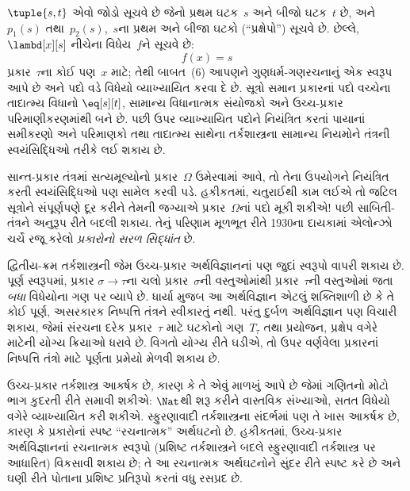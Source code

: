$\tuple{s, t}$ એવો જોડો સૂચવે છે જેનો પ્રથમ ઘટક~$s$ અને બીજો ઘટક~$t$
છે, અને $p_1(s)$ તથા~$p_2(s)$,~$s$ના પ્રથમ અને બીજા ઘટકો
(``પ્રક્ષેપો'') સૂચવે છે. છેલ્લે, $\lambd[x][s]$ નીચેના વિધેય~$f$ને
સૂચવે છે:
\[
f(x) = s
\]
પ્રકાર~$\tau$ના કોઈ પણ~$x$ માટે; તેથી બાબત~(6) આપણને
ગુણધર્મ-ગણરચનાનું એક સ્વરૂપ આપે છે અને પદો વડે વિધેયો વ્યાખ્યાયિત કરવા
દે છે.
સૂત્રો સમાન પ્રકારનાં પદો વચ્ચેના તાદાત્મ્ય વિધાનો
$\eq[s][t]$, સામાન્ય વિધાનાત્મક સંયોજકો અને ઉચ્ચ-પ્રકાર પરિમાણીકરણમાંથી
બને છે. પછી ઉપર વ્યાખ્યાયિત પદોને નિયંત્રિત કરતાં પાયાનાં સમીકરણો અને
પરિમાણકો તથા તાદાત્મ્ય સાથેના તર્કશાસ્ત્રના સામાન્ય નિયમોને તંત્રની
સ્વયંસિદ્ધિઓ તરીકે લઈ શકાય છે.

સાન્ત-પ્રકાર તંત્રમાં સત્યમૂલ્યોનો પ્રકાર~$\Omega$ ઉમેરવામાં આવે, તો
તેના ઉપયોગને નિયંત્રિત કરતી સ્વયંસિદ્ધિઓ પણ સામેલ કરવી પડે. હકીકતમાં,
ચતુરાઈથી કામ લઈએ તો જટિલ સૂત્રોને સંપૂર્ણપણે દૂર કરીને તેમની
જગ્યાએ પ્રકાર~$\Omega$નાં પદો મૂકી શકીએ!{} પછી સાબિતી-તંત્રને અનુરૂપ
રીતે બદલી શકાય. તેનું પરિણામ મૂળભૂત રીતે 1930ના દાયકામાં એલોન્ઝો
ચર્ચે રજૂ કરેલો \emph{પ્રકારોનો સરળ સિદ્ધાંત} છે.

દ્વિતીય-ક્રમ તર્કશાસ્ત્રની જેમ ઉચ્ચ-પ્રકાર અર્થવિજ્ઞાનનાં પણ જુદાં
સ્વરૂપો વાપરી શકાય છે. પૂર્ણ સ્વરૂપમાં, પ્રકાર $\sigma \to \tau$ના ચલો
પ્રકાર~$\sigma$ની વસ્તુઓમાંથી પ્રકાર~$\tau$ની વસ્તુઓમાં જતા \emph{બધા}
વિધેયોના ગણ પર વ્યાપે છે. ધાર્યા મુજબ આ અર્થવિજ્ઞાન એટલું શક્તિશાળી છે
કે તે કોઈ પૂર્ણ, અસરકારક નિષ્પત્તિ તંત્રને સ્વીકારતું નથી. પરંતુ
દુર્બળ અર્થવિજ્ઞાન પણ વિચારી શકાય, જેમાં સંરચના દરેક
પ્રકાર~$\tau$ માટે ઘટકોનો ગણ~$T_\tau$ તથા પ્રયોજન, પ્રક્ષેપ
વગેરે માટેની યોગ્ય ક્રિયાઓ ધરાવે છે. વિગતો યોગ્ય રીતે ઘડીએ, તો ઉપર
વર્ણવેલા પ્રકારનાં નિષ્પત્તિ તંત્રો માટે પૂર્ણતા પ્રમેયો મેળવી
શકાય છે.

ઉચ્ચ-પ્રકાર તર્કશાસ્ત્ર આકર્ષક છે, કારણ કે તે એવું માળખું આપે છે જેમાં
ગણિતનો મોટો ભાગ કુદરતી રીતે સમાવી શકીએ: $\Nat$થી શરૂ કરીને વાસ્તવિક
સંખ્યાઓ, સતત વિધેયો વગેરે વ્યાખ્યાયિત કરી શકીએ. સ્ફુરણાવાદી
તર્કશાસ્ત્રના સંદર્ભમાં પણ તે ખાસ આકર્ષક છે, કારણ કે પ્રકારોનાં સ્પષ્ટ
``રચનાત્મક'' અર્થઘટનો છે. હકીકતમાં, ઉચ્ચ-પ્રકાર અર્થવિજ્ઞાનનાં
રચનાત્મક સ્વરૂપો (પ્રશિષ્ટ તર્કશાસ્ત્રને બદલે સ્ફુરણાવાદી તર્કશાસ્ત્ર
પર આધારિત) વિકસાવી શકાય છે; તે આ રચનાત્મક અર્થઘટનોને સુંદર રીતે સ્પષ્ટ
કરે છે અને ઘણી રીતે પોતાના પ્રશિષ્ટ પ્રતિરૂપો કરતાં વધુ રસપ્રદ છે.
\endgroup


